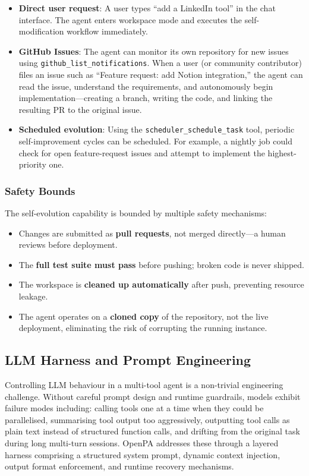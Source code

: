 \begin{itemize}[leftmargin=*]
  \item \textbf{Direct user request}: A user types ``add a LinkedIn tool'' in the chat interface. The agent enters workspace mode and executes the self-modification workflow immediately.
  \item \textbf{GitHub Issues}: The agent can monitor its own repository for new issues using \texttt{github\_list\_notifications}. When a user (or community contributor) files an issue such as ``Feature request: add Notion integration,'' the agent can read the issue, understand the requirements, and autonomously begin implementation---creating a branch, writing the code, and linking the resulting PR to the original issue.
  \item \textbf{Scheduled evolution}: Using the \texttt{scheduler\_schedule\_task} tool, periodic self-improvement cycles can be scheduled. For example, a nightly job could check for open feature-request issues and attempt to implement the highest-priority one.
\end{itemize}

\subsubsection{Safety Bounds}

The self-evolution capability is bounded by multiple safety mechanisms:

\begin{itemize}[leftmargin=*]
  \item Changes are submitted as \textbf{pull requests}, not merged directly---a human reviews before deployment.
  \item The \textbf{full test suite must pass} before pushing; broken code is never shipped.
  \item The workspace is \textbf{cleaned up automatically} after push, preventing resource leakage.
  \item The agent operates on a \textbf{cloned copy} of the repository, not the live deployment, eliminating the risk of corrupting the running instance.
\end{itemize}

\subsection{LLM Harness and Prompt Engineering}

Controlling LLM behaviour in a multi-tool agent is a non-trivial engineering challenge. Without careful prompt design and runtime guardrails, models exhibit failure modes including: calling tools one at a time when they could be parallelised, summarising tool output too aggressively, outputting tool calls as plain text instead of structured function calls, and drifting from the original task during long multi-turn sessions. OpenPA addresses these through a layered harness comprising a structured system prompt, dynamic context injection, output format enforcement, and runtime recovery mechanisms.

